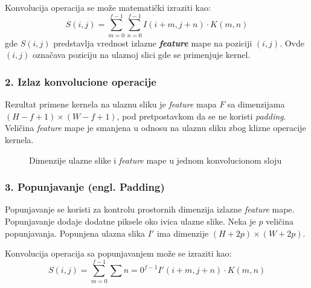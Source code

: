 \documentclass[12pt]{article}
\begin{document}
   Konvolucija operacija se može matematički izraziti kao:
   \[
   S(i, j) = \sum_{m=0}^{f-1} \sum_{n=0}^{f-1} I(i+m, j+n) \cdot K(m, n)
   \]
   gde \( S(i, j) \) predstavlja vrednost izlazne \textbf{\textit{feature}} mape na poziciji 
   \((i, j)\). Ovde \( (i, j) \) označava poziciju na ulaznoj slici gde se primenjuje kernel.

   \subsubsection*{2. Izlaz konvolucione operacije}
   Rezultat primene kernela na ulaznu sliku je \textit{feature} mapa \( F \) 
   sa dimenzijama \((H - f + 1) \times (W - f + 1)\), pod pretpostavkom da se ne 
   koristi \textit{padding}. Veličina \textit{feature} mape je 
   smanjena u odnosu na ulaznu sliku zbog klizne operacije kernela.

   \newpage   

   \begin{figure}[h!]
      \centering
      \caption{Dimenzije ulazne slike i \textit{feature} mape u jednom konvolucionom sloju}
      \label{fig:convolution}
    \end{figure}

    \subsubsection*{3. Popunjavanje (engl. Padding)}

    Popunjavanje se koristi za kontrolu prostornih dimenzija izlazne \textit{feature} mape. 
    Popunjavanje dodaje dodatne piksele oko ivica ulazne slike. 
    Neka je \( p \) veličina popunjavanja. 
    Popunjena ulazna slika \( I' \) ima dimenzije \((H + 2p) \times (W + 2p)\).
    
    Konvolucija operacija sa popunjavanjem može se izraziti kao:
    \[
    S(i, j) = \sum_{m=0}^{f-1} \sum{n=0}^{f-1} I'(i+m, j+n) \cdot K(m, n)
    \]
\end{document}
